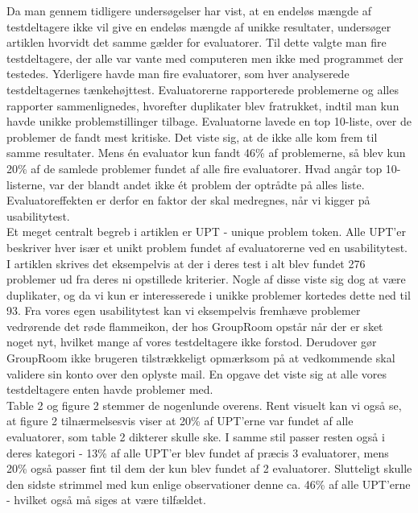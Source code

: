 \documentclass[12pt]{article}
\begin{document}
\noindent Da man gennem tidligere undersøgelser har vist, at en endeløs mængde af testdeltagere ikke vil give en endeløs mængde af unikke resultater, undersøger artiklen hvorvidt det samme gælder for evaluatorer. Til dette valgte man fire testdeltagere, der alle var vante med computeren men ikke med programmet der testedes. Yderligere havde man fire evaluatorer, som hver analyserede testdeltagernes tænkehøjttest. Evaluatorerne rapporterede problemerne og alles rapporter sammenlignedes, hvorefter duplikater blev fratrukket, indtil man kun havde unikke problemstillinger tilbage. Evaluatorne lavede en top 10-liste, over de problemer de fandt mest kritiske. Det viste sig, at de ikke alle kom frem til samme resultater. Mens én evaluator kun fandt 46\% af problemerne, så blev kun 20\% af de samlede problemer fundet af alle fire evaluatorer. Hvad angår top 10-listerne, var der blandt andet ikke ét problem der optrådte på alles liste. Evaluatoreffekten er derfor en faktor der skal medregnes, når vi kigger på usabilitytest.\\

\noindent Et meget centralt begreb i artiklen er UPT - unique problem token. Alle UPT'er beskriver hver især et unikt problem fundet af evaluatorerne ved en usabilitytest. I artiklen skrives det eksempelvis at der i deres test i alt blev fundet 276 problemer ud fra deres ni opstillede kriterier. Nogle af disse viste sig dog at være duplikater, og da vi kun er interesserede i unikke problemer kortedes dette ned til 93. Fra vores egen usabilitytest kan vi eksempelvis fremhæve problemer vedrørende det røde flammeikon, der hos GroupRoom opstår når der er sket noget nyt, hvilket mange af vores testdeltagere ikke forstod. Derudover gør GroupRoom ikke brugeren tilstrækkeligt opmærksom på at vedkommende skal validere sin konto over den oplyste mail. En opgave det viste sig at alle vores testdeltagere enten havde problemer med.\\

\noindent Table 2 og figure 2 stemmer de nogenlunde overens. Rent visuelt kan vi også se, at figure 2 tilnærmelsesvis viser at 20\% af UPT'erne var fundet af alle evaluatorer, som table 2 dikterer skulle ske. I samme stil passer resten også i deres kategori - 13\% af alle UPT'er blev fundet af præcis 3 evaluatorer, mens 20\% også passer fint til dem der kun blev fundet af 2 evaluatorer. Slutteligt skulle den sidste strimmel med kun enlige observationer denne ca. 46\% af alle UPT'erne - hvilket også må siges at være tilfældet.\\
\end{document}
